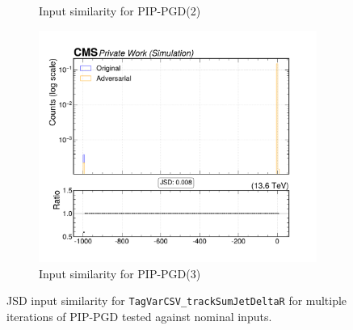 \begin{figure}[htbp]
\begin{subfigure}[t]{0.32\textwidth}
    \caption*{Input similarity for PIP-PGD(2)}
  \end{subfigure}\hfill
  \begin{subfigure}[t]{0.32\textwidth}
    \includegraphics[width=\linewidth]{media/output/features/compare/combined_it_3/cmp_global_features_TagVarCSV_trackSumJetDeltaR.pdf}
    \caption*{Input similarity for PIP-PGD(3)}
  \end{subfigure}

  \caption*{JSD input similarity for \texttt{TagVarCSV\_trackSumJetDeltaR} for multiple iterations of PIP-PGD tested against nominal inputs.}
  \label{fig:combined_input_TagVarCSV_trackSumJetDeltaR}
\end{figure}

